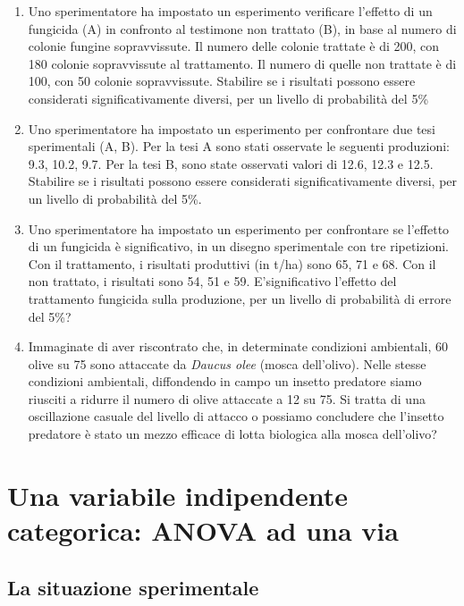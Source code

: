 \documentclass[a4paper,12pt,oneside]{book}
\providecommand{\tightlist}{%
  \setlength{\itemsep}{0pt}\setlength{\parskip}{0pt}}
\theoremstyle{definition}
\theoremstyle{definition}
\theoremstyle{definition}
\theoremstyle{remark}
\begin{document}
\begin{enumerate}
\def\labelenumi{\arabic{enumi}.}
\tightlist
\item
  Uno sperimentatore ha impostato un esperimento verificare l'effetto di
  un fungicida (A) in confronto al testimone non trattato (B), in base
  al numero di colonie fungine sopravvissute. Il numero delle colonie
  trattate è di 200, con 180 colonie sopravvissute al trattamento. Il
  numero di quelle non trattate è di 100, con 50 colonie sopravvissute.
  Stabilire se i risultati possono essere considerati significativamente
  diversi, per un livello di probabilità del 5\%
\item
  Uno sperimentatore ha impostato un esperimento per confrontare due
  tesi sperimentali (A, B). Per la tesi A sono stati osservate le
  seguenti produzioni: 9.3, 10.2, 9.7. Per la tesi B, sono state
  osservati valori di 12.6, 12.3 e 12.5. Stabilire se i risultati
  possono essere considerati significativamente diversi, per un livello
  di probabilità del 5\%.
\item
  Uno sperimentatore ha impostato un esperimento per confrontare se
  l'effetto di un fungicida è significativo, in un disegno sperimentale
  con tre ripetizioni. Con il trattamento, i risultati produttivi (in
  t/ha) sono 65, 71 e 68. Con il non trattato, i risultati sono 54, 51 e
  59. E'significativo l'effetto del trattamento fungicida sulla
  produzione, per un livello di probabilità di errore del 5\%?
\item
  Immaginate di aver riscontrato che, in determinate condizioni
  ambientali, 60 olive su 75 sono attaccate da \emph{Daucus olee} (mosca
  dell'olivo). Nelle stesse condizioni ambientali, diffondendo in campo
  un insetto predatore siamo riusciti a ridurre il numero di olive
  attaccate a 12 su 75. Si tratta di una oscillazione casuale del
  livello di attacco o possiamo concludere che l'insetto predatore è
  stato un mezzo efficace di lotta biologica alla mosca dell'olivo?
\end{enumerate}

\chapter{Una variabile indipendente categorica: ANOVA ad una
via}\label{una-variabile-indipendente-categorica-anova-ad-una-via}

\section{La situazione sperimentale}\label{la-situazione-sperimentale}
\end{document}
